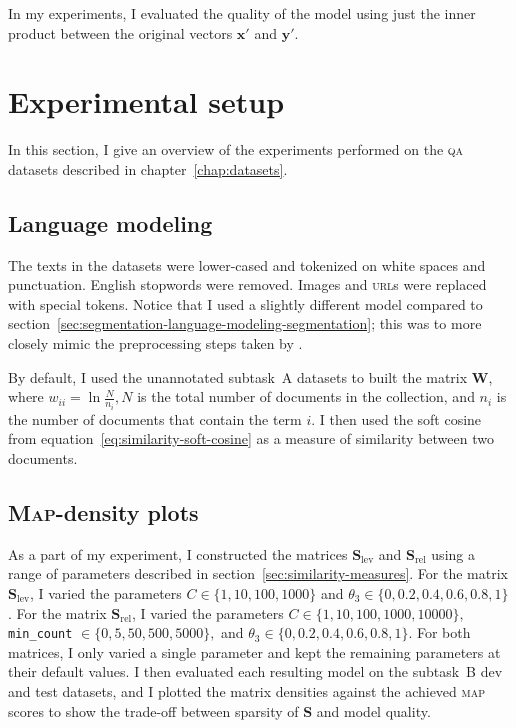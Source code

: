 \documentclass[
  digital, %
  notable, %
  lof,     %
  lot,     %
  nopalatino, color
]{fithesis3}
\def\abbr#1{\textsc{\MakeLowercase{#1}}}
\begin{document}
In my experiments, I evaluated the quality of the model using just the inner
product between the original vectors $\mathbf x'$ and $\mathbf y'$.

\section{Experimental setup}
\label{sec:similarity-experimental-setup}
In this section, I give an overview of the experiments performed on the
\abbr{QA}\index{qa@\abbr{QA}} datasets described in chapter~\ref{chap:datasets}.

\subsection{Language modeling}
The texts in the datasets were lower-cased and tokenized on white spaces and
punctuation. English stopwords were removed. Images and \abbr{URL}s were
replaced with special tokens. Notice that I used a slightly different
model compared to section~\ref{sec:segmentation-language-modeling-segmentation};
this was to more closely mimic the preprocessing steps taken by
\textcite{charletdamnati17}.

By default, I used the unannotated subtask~A datasets to built the matrix
$\mathbf W$, where $w_{ii}=\ln\frac N
{n_i},N$ is the total number of
documents in the collection, and $n_i$ is the number of documents that contain
the term $i$.  I then used the soft cosine from
equation~\ref{eq:similarity-soft-cosine} as a measure of similarity between two
documents.

\subsection{\textsc{Map}-density plots}\index{map@\abbr {MAP}}
As a part of my experiment, I constructed the matrices $\mathbf
S_{\textrm{lev}}$ and $\mathbf
S_{\textrm{rel}}$ using a range of
parameters described in section~\ref{sec:similarity-measures}. For the matrix
$\mathbf S_{\textrm{lev}}$, I varied the parameters
$C\in\{1,10,100,1000\}$ and
$\theta_3\in\{0,0.2,0.4,0.6,0.8,1\}$. For the matrix
$\mathbf S_{\textrm{rel}}$, I varied the parameters
$C\in\{1,10,100,1000,10000\},$ \texttt{min\_count}%
${}\in\{0,5,50,500,5000\},$ and
$\theta_3\in\{0,0.2,0.4,0.6,0.8,1\}$.  For both matrices,
I only varied a single parameter and kept the remaining parameters at their
default values. I then evaluated each resulting model on the subtask~B dev and
test datasets, and I plotted the matrix densities against the achieved
\abbr{MAP}\index{map@\abbr {MAP}} scores to show the trade-off between
sparsity of $\mathbf S$ and model quality.
\end{document}
